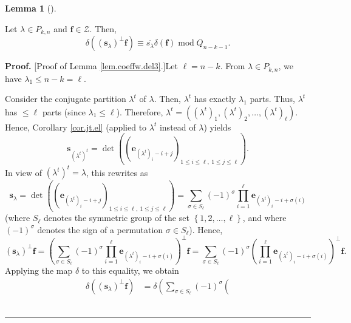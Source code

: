 \documentclass[numbers=enddot,12pt,final,onecolumn,notitlepage]{scrartcl}%
\theoremstyle{definition}
\newtheorem{lem}[theo]{Lemma}
\newenvironment{lemma}[1][]
{\begin{lem}[#1]\begin{leftbar}}
{\end{leftbar}\end{lem}}
\newenvironment{proof}[1][Proof]{\noindent\textbf{#1.} }{\ \rule{0.5em}{0.5em}}
\let\sumnonlimits\sum
\let\prodnonlimits\prod
\renewcommand{\sum}{\sumnonlimits\limits}
\renewcommand{\prod}{\prodnonlimits\limits}
\begin{document}
\begin{lemma}
\label{lem.coeffw.del3}Let $\lambda\in P_{k,n}$ and $\mathbf{f}\in\mathcal{Z}%
$. Then,%
\[
\delta\left(  \left(  \mathbf{s}_{\lambda}\right)  ^{\perp}\mathbf{f}\right)
\equiv\overline{s_{\lambda}}\delta\left(  \mathbf{f}\right)
\operatorname{mod}Q_{n-k-1}.
\]

\end{lemma}

\begin{proof}
[Proof of Lemma \ref{lem.coeffw.del3}.]Let $\ell=n-k$. From $\lambda\in
P_{k,n}$, we have $\lambda_{1}\leq n-k=\ell$.

Consider the conjugate partition $\lambda^{t}$ of $\lambda$. Then,
$\lambda^{t}$ has exactly $\lambda_{1}$ parts. Thus, $\lambda^{t}$ has
$\leq\ell$ parts (since $\lambda_{1}\leq\ell$). Therefore, $\lambda
^{t}=\left(  \left(  \lambda^{t}\right)  _{1},\left(  \lambda^{t}\right)
_{2},\ldots,\left(  \lambda^{t}\right)  _{\ell}\right)  $. Hence, Corollary
\ref{cor.jt.el} (applied to $\lambda^{t}$ instead of $\lambda$) yields%
\[
\mathbf{s}_{\left(  \lambda^{t}\right)  ^{t}}=\det\left(  \left(
\mathbf{e}_{\left(  \lambda^{t}\right)  _{i}-i+j}\right)  _{1\leq i\leq
\ell,\ 1\leq j\leq\ell}\right)  .
\]
In view of $\left(  \lambda^{t}\right)  ^{t}=\lambda$, this rewrites as
\begin{equation}
\mathbf{s}_{\lambda}=\det\left(  \left(  \mathbf{e}_{\left(  \lambda
^{t}\right)  _{i}-i+j}\right)  _{1\leq i\leq\ell,\ 1\leq j\leq\ell}\right)
=\sum_{\sigma\in S_{\ell}}\left(  -1\right)  ^{\sigma}\prod_{i=1}^{\ell
}\mathbf{e}_{\left(  \lambda^{t}\right)  _{i}-i+\sigma\left(  i\right)  }
\label{pf.lem.coeffw.del3.jt}%
\end{equation}
(where $S_{\ell}$ denotes the symmetric group of the set $\left\{
1,2,\ldots,\ell\right\}  $, and where $\left(  -1\right)  ^{\sigma}$ denotes
the sign of a permutation $\sigma\in S_{\ell}$). Hence,%
\[
\left(  \mathbf{s}_{\lambda}\right)  ^{\perp}\mathbf{f}=\left(  \sum
_{\sigma\in S_{\ell}}\left(  -1\right)  ^{\sigma}\prod_{i=1}^{\ell}%
\mathbf{e}_{\left(  \lambda^{t}\right)  _{i}-i+\sigma\left(  i\right)
}\right)  ^{\perp}\mathbf{f}=\sum_{\sigma\in S_{\ell}}\left(  -1\right)
^{\sigma}\left(  \prod_{i=1}^{\ell}\mathbf{e}_{\left(  \lambda^{t}\right)
_{i}-i+\sigma\left(  i\right)  }\right)  ^{\perp}\mathbf{f}.
\]
Applying the map $\delta$ to this equality, we obtain%
\begin{align}
\delta\left(  \left(  \mathbf{s}_{\lambda}\right)  ^{\perp}\mathbf{f}\right)
&  =\delta\left(  \sum_{\sigma\in S_{\ell}}\left(  -1\right)  ^{\sigma}\left(

\end{align}
\end{proof}
\end{document}
